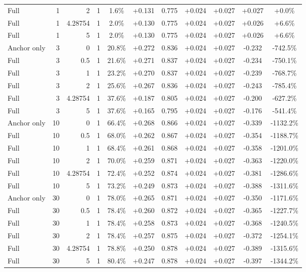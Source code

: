 \begin{table}[htbp]
\begin{tabular}{lrrrccccccc}
Full & 1 & 2 & 1 & 1.6\% & +0.131 & 0.775 & +0.024 & +0.027 & +0.027 & +0.0\% \\
Full & 1 & 4.28754 & 1 & 2.0\% & +0.130 & 0.775 & +0.024 & +0.027 & +0.026 & +6.6\% \\
Full & 1 & 5 & 1 & 2.0\% & +0.130 & 0.775 & +0.024 & +0.027 & +0.026 & +6.6\% \\
Anchor only & 3 & 0 & 1 & 20.8\% & +0.272 & 0.836 & +0.024 & +0.027 & -0.232 & -742.5\% \\
Full & 3 & 0.5 & 1 & 21.6\% & +0.271 & 0.837 & +0.024 & +0.027 & -0.234 & -750.1\% \\
Full & 3 & 1 & 1 & 23.2\% & +0.270 & 0.837 & +0.024 & +0.027 & -0.239 & -768.7\% \\
Full & 3 & 2 & 1 & 25.6\% & +0.267 & 0.836 & +0.024 & +0.027 & -0.243 & -785.4\% \\
Full & 3 & 4.28754 & 1 & 37.6\% & +0.187 & 0.805 & +0.024 & +0.027 & -0.200 & -627.2\% \\
Full & 3 & 5 & 1 & 37.6\% & +0.165 & 0.795 & +0.024 & +0.027 & -0.176 & -541.4\% \\
Anchor only & 10 & 0 & 1 & 66.4\% & +0.268 & 0.866 & +0.024 & +0.027 & -0.339 & -1132.2\% \\
Full & 10 & 0.5 & 1 & 68.0\% & +0.262 & 0.867 & +0.024 & +0.027 & -0.354 & -1188.7\% \\
Full & 10 & 1 & 1 & 68.4\% & +0.261 & 0.868 & +0.024 & +0.027 & -0.358 & -1201.0\% \\
Full & 10 & 2 & 1 & 70.0\% & +0.259 & 0.871 & +0.024 & +0.027 & -0.363 & -1220.0\% \\
Full & 10 & 4.28754 & 1 & 72.4\% & +0.252 & 0.874 & +0.024 & +0.027 & -0.381 & -1286.6\% \\
Full & 10 & 5 & 1 & 73.2\% & +0.249 & 0.873 & +0.024 & +0.027 & -0.388 & -1311.6\% \\
Anchor only & 30 & 0 & 1 & 78.0\% & +0.265 & 0.871 & +0.024 & +0.027 & -0.350 & -1171.6\% \\
Full & 30 & 0.5 & 1 & 78.4\% & +0.260 & 0.872 & +0.024 & +0.027 & -0.365 & -1227.7\% \\
Full & 30 & 1 & 1 & 78.4\% & +0.258 & 0.873 & +0.024 & +0.027 & -0.368 & -1240.5\% \\
Full & 30 & 2 & 1 & 78.4\% & +0.257 & 0.875 & +0.024 & +0.027 & -0.372 & -1254.1\% \\
Full & 30 & 4.28754 & 1 & 78.8\% & +0.250 & 0.878 & +0.024 & +0.027 & -0.389 & -1315.6\% \\
Full & 30 & 5 & 1 & 80.4\% & +0.247 & 0.878 & +0.024 & +0.027 & -0.397 & -1344.2\% \\

\end{tabular}
\end{table}
